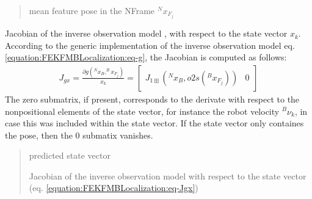 \documentclass[letterpaper,10pt,english]{sphinxmanual}
\begin{document}
\begin{fulllineitems}
\begin{fulllineitems}
\begin{quote}
\begin{description}
\begin{itemize}
\end{itemize}

\sphinxAtStartPar
mean feature pose in the N\sphinxhyphen{}Frame \(^Nx_{F_j}\)

\end{description}\end{quote}

\end{fulllineitems}


\begin{fulllineitems}
\label{\detokenize{FEKFMBLocalization:MapFeature.MapFeature.Jgx}}
\pysigstartsignatures
{}
\pysigstopsignatures
\sphinxAtStartPar
Jacobian of the inverse observation model {\hyperref[\detokenize{FEKFMBLocalization:MapFeature.MapFeature.g}]{}}, with respect to the state vector \(x_k\).
According to the generic implementation of the inverse observation model {\hyperref[\detokenize{FEKFMBLocalization:MapFeature.MapFeature.g}]{}} eq. \eqref{equation:FEKFMBLocalization:eq-g}, the Jacobian is computed as follows:
\begin{equation}\label{equation:FEKFMBLocalization:eq-Jgx}
\begin{split}J_{gx}=\frac{\partial g(^Nx_B,^Bx_{F_j})}{x_k}=\begin{bmatrix} J_{1\boxplus}(^Nx_B,o2s(^Bx_{F_j})) & 0  \end{bmatrix}\end{split}
\end{equation}
\sphinxAtStartPar
The zero submatrix, if present, corresponds to the derivate with respect to the non\sphinxhyphen{}positional elements of the
state vector, for instance the robot velocity \(^B\nu_k\), in case this was included within the state vector.
If the state vector only containes the pose, then the 0 submatix vanishes.
\begin{quote}\begin{description}
\sphinxAtStartPar
{} \textendash{} predicted state vector

\sphinxAtStartPar
Jacobian of the inverse observation model {\hyperref[\detokenize{FEKFMBLocalization:MapFeature.MapFeature.g}]{}} with respect to the state vector (eq. \eqref{equation:FEKFMBLocalization:eq-Jgx})


\end{description}
\end{quote}
\end{fulllineitems}
\end{fulllineitems}
\end{document}
